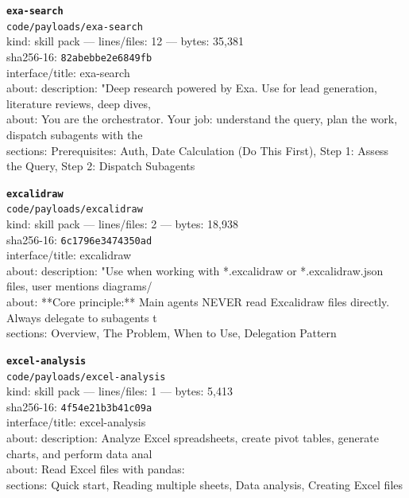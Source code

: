 \noindent\textbf{\texttt{exa-search}}\\
\texttt{code/payloads/exa-search}\\
kind: skill pack --- lines/files: 12 --- bytes: 35,381\\
sha256-16: \texttt{82abebbe2e6849fb}\\
interface/title: exa-search\\
about: description: "Deep research powered by Exa. Use for lead generation, literature reviews, deep dives,\\
about: You are the orchestrator. Your job: understand the query, plan the work, dispatch subagents with the\\
sections: Prerequisites: Auth, Date Calculation (Do This First), Step 1: Assess the Query, Step 2: Dispatch Subagents\\
\vspace*{6.0pt}
\newpage

\noindent\textbf{\texttt{excalidraw}}\\
\texttt{code/payloads/excalidraw}\\
kind: skill pack --- lines/files: 2 --- bytes: 18,938\\
sha256-16: \texttt{6c1796e3474350ad}\\
interface/title: excalidraw\\
about: description: "Use when working with *.excalidraw or *.excalidraw.json files, user mentions diagrams/\\
about: **Core principle:** Main agents NEVER read Excalidraw files directly. Always delegate to subagents t\\
sections: Overview, The Problem, When to Use, Delegation Pattern\\
\vspace*{6.0pt}

\noindent\textbf{\texttt{excel-analysis}}\\
\texttt{code/payloads/excel-analysis}\\
kind: skill pack --- lines/files: 1 --- bytes: 5,413\\
sha256-16: \texttt{4f54e21b3b41c09a}\\
interface/title: excel-analysis\\
about: description: Analyze Excel spreadsheets, create pivot tables, generate charts, and perform data anal\\
about: Read Excel files with pandas:\\
sections: Quick start, Reading multiple sheets, Data analysis, Creating Excel files\\
\vspace*{6.0pt}

